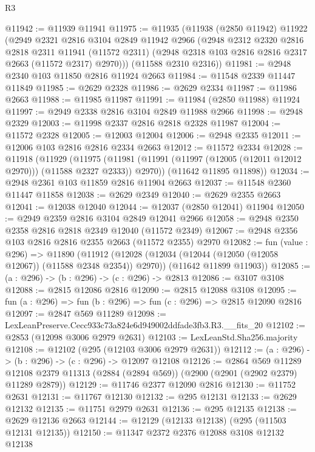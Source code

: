 \begin{lexlean}{R3}
\begin{coremodule}
@11942 := @11939 @11941
@11975 := @11935
    (@11938
      (@2850 @11942)
      @11922
      (@2949
        @2321
        @2816
        @3104
        @2849
        @11942
        @2966
        (@2948
          @2312
          @2320
          @2816
          @2818
          @2311
          @11941
          (@11572 @2311)
          (@2948 @2318 @103 @2816 @2816 @2317 @2663 (@11572 @2317) @2970)))
      (@11588 @2310 @2316))
@11981 := @2948 @2340 @103 @11850 @2816 @11924 @2663
@11984 := @11548 @2339 @11447 @11849
@11985 := @2629 @2328
@11986 := @2629 @2334
@11987 := @11986 @2663
@11988 := @11985 @11987
@11991 := @11984 (@2850 @11988) @11924
@11997 := @2949 @2338 @2816 @3104 @2849 @11988 @2966
@11998 := @2948 @2329
@12003 := @11998 @2337 @2816 @2818 @2328 @11987
@12004 := @11572 @2328
@12005 := @12003 @12004
@12006 := @2948 @2335
@12011 := @12006 @103 @2816 @2816 @2334 @2663
@12012 := @11572 @2334
@12028 := @11918
    (@11929
      (@11975 (@11981 (@11991 (@11997 (@12005 (@12011 @12012 @2970))) (@11588 @2327 @2333)) @2970))
      (@11642 @11895 @11898))
@12034 := @2948 @2361 @103 @11859 @2816 @11904 @2663
@12037 := @11548 @2360 @11447 @11858
@12038 := @2629 @2349
@12040 := @2629 @2355 @2663
@12041 := @12038 @12040
@12044 := @12037 (@2850 @12041) @11904
@12050 := @2949 @2359 @2816 @3104 @2849 @12041 @2966
@12058 := @2948 @2350 @2358 @2816 @2818 @2349 @12040 (@11572 @2349)
@12067 := @2948 @2356 @103 @2816 @2816 @2355 @2663 (@11572 @2355) @2970
@12082 := fun (value : @296) =>
  @11890
    (@11912
      (@12028 (@12034 (@12044 (@12050 (@12058 @12067)) (@11588 @2348 @2354)) @2970))
      (@11642 @11899 @11903))
@12085 := (a : @296) -> (b : @296) -> (c : @296) -> @2813
@12086 := @3107 @3108
@12088 := @2815 @12086 @2816
@12090 := @2815 @12088 @3108
@12095 := fun (a : @296) => fun (b : @296) => fun (c : @296) => @2815 @12090 @2816
@12097 := @2847 @569 @11289
@12098 := LexLeanPreserve.Cecc933c73a824e6d949002ddfade3fb3.R3.__fits_20
@12102 := @2853 (@12098 @3006 @2979 @2631)
@12103 := LexLeanStd.Sha256.majority
@12108 := @12102 (@295 (@12103 @3006 @2979 @2631))
@12112 := (a : @296) -> (b : @296) -> (c : @296) -> @12097 @12108
@12126 := @2864
    @569
    @11289
    @12108
    @2379
    @11313
    (@2884 (@2894 @569))
    (@2900 (@2901 (@2902 @2379) @11289 @2879))
@12129 := @11746 @2377 @12090 @2816
@12130 := @11752 @2631
@12131 := @11767 @12130
@12132 := @295 @12131
@12133 := @2629 @12132
@12135 := @11751 @2979 @2631
@12136 := @295 @12135
@12138 := @2629 @12136 @2663
@12144 := @12129 (@12133 @12138) (@295 (@11503 @12131 @12135))
@12150 := @11347 @2372 @2376 @12088 @3108 @12132 @12138

\end{coremodule}
\end{lexlean}
